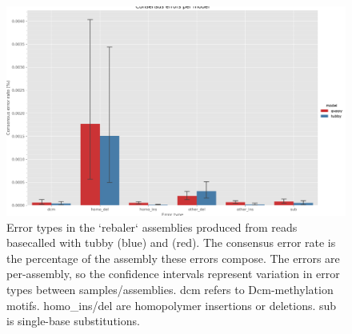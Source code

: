\begin{figure}
\includegraphics[width=1.0\textwidth]{Chapter4/Figs/consensus-error-types.png}
\centering
\caption{Error types in the `rebaler` assemblies produced from reads basecalled with tubby (blue) and \guppy{} (red). The consensus error rate is the percentage of the assembly these errors compose. The errors are per-assembly, so the confidence intervals represent variation in error types between samples/assemblies. dcm refers to Dcm-methylation motifs. homo\_ins/del are homopolymer insertions or deletions. sub is single-base substitutions.}
\label{fig:error_types}
\end{figure}

